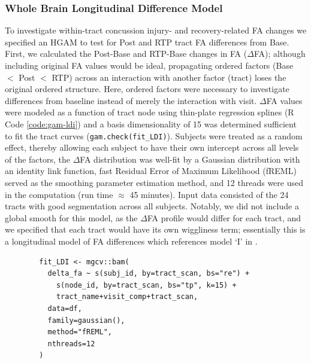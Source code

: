 \documentclass[]{imag-ms-template}
\begin{document}
\subsubsection{Whole Brain Longitudinal Difference Model}
\label{sssec:meth-gam-ldi}
To investigate within-tract concussion injury- and recovery-related FA changes we specified an HGAM to test for Post and RTP tract FA differences from Base. First, we calculated the Post-Base and RTP-Base changes in FA ($\Delta$FA); although including original FA values would be ideal, propagating ordered factors (Base $<$ Post $<$ RTP) across an interaction with another factor (tract) loses the original ordered structure. Here, ordered factors were necessary to investigate differences from baseline instead of merely the interaction with visit. $\Delta$FA values were modeled as a function of tract node using thin-plate regression splines (R Code \ref{code:gam-ldi}) and a basis dimensionality of 15 was determined sufficient to fit the tract curves (\lstinline{gam.check(fit_LDI)}). Subjects were treated as a random effect, thereby allowing each subject to have their own intercept across all levels of the factors, the $\Delta$FA distribution was well-fit by a Gaussian distribution with an identity link function, fast Residual Error of Maximum Likelihood (fREML) served as the smoothing parameter estimation method, and 12 threads were used in the computation (run time $\approx$ 45 minutes). Input data consisted of the 24 tracts with good segmentation across all subjects. Notably, we did not include a global smooth for this model, as the $\Delta$FA profile would differ for each tract, and we specified that each tract would have its own wiggliness term; essentially this is a longitudinal model of FA differences which references model `I' in \textcite{pedersen2019HierarchicalGeneralizedAdditive}.

\begin{equ}[H]
	\begin{lstlisting}
		fit_LDI <- mgcv::bam(
		  delta_fa ~ s(subj_id, by=tract_scan, bs="re") +
		    s(node_id, by=tract_scan, bs="tp", k=15) +
		    tract_name+visit_comp+tract_scan,
		  data=df,
		  family=gaussian(),
		  method="fREML",
		  nthreads=12
		)
	\end{lstlisting}
	\caption{$\Delta$FA values are modeled as a function of tract node with thin-plate regression smooths for each tract, accounting for the within-subject factors of tract and visit and using separate wiggliness terms for each tract. \lstinline{delta_fa} = RTP-Base and Post-Base FA differences, \lstinline{subj_id} = subject identifier factor, \lstinline{node_id} = node identifier integer, \lstinline{tract_name} = tract identifier factor, \lstinline{visit_comp} = visit comparison factor (RTP-Base, Post-Base), and \lstinline{tract_scan} = interaction of \lstinline{tract_name} and \lstinline{visit_comp}.}
	\label{code:gam-ldi}
\end{equ}
\end{document}
